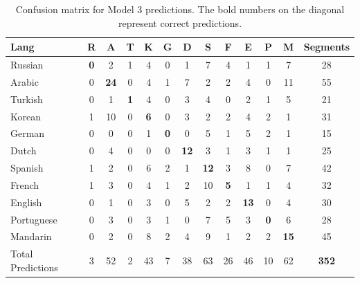 \begin{table}
\begin{center}
\caption{Confusion matrix for Model 3 predictions. The bold numbers on the diagonal represent correct predictions.}
\begin{tabular}{l | c c c c c c c c c c c || c}
Lang			&R &A &T &K &G &D &S &F &E &P &M & Segments\\ \hline
Russian		&\textbf{0}  &2  &1  &4  &0  &1  &7  &4  &1  &1  &7 &28\\
Arabic		&0 &\textbf{24}  &0  &4  &1  &7  &2  &2  &4  &0 &11 &55\\
Turkish		&0  &1  &\textbf{1}  &4  &0  &3  &4  &0   &2  &1  &5 &21\\
Korean		&1 &10  &0  &\textbf{6}  &0  &3  &2  &2  &4  &2  &1 &31\\
German		&0  &0  &0  &1  &\textbf{0}  &0  &5  &1  &5  &2  &1 &15\\
Dutch		&0  &4  &0  &0  &0 &\textbf{12} & 3  &1  &3  &1  &1 &25\\
Spanish		&1  &2  &0  &6  &2  &1 &\textbf{12}  &3  &8  &0  &7 &42\\
French		&1  &3  &0  &4  &1  &2 &10 & \textbf{5}  &1  &1  &4 &32\\
English		&0  &1  &0  &3  &0  &5  &2  & 2 &\textbf{13}  &0  &4 &30\\
Portuguese	&0  &3  &0  &3  &1  &0  &7  & 5  & 3  &\textbf{0}  &6 &28\\
Mandarin		&0  &2 & 0  &8  &2  &4  &9  & 1  & 2  &2 &\textbf{15} &45\\ \hline
Total Predictions&3 &52 &2 &43 &7 &38 &63 &26 &46 &10 &62 &\textbf{352}\\

\end{tabular}
\label{tab:LangConfMat}
\end{center}
\end{table}

